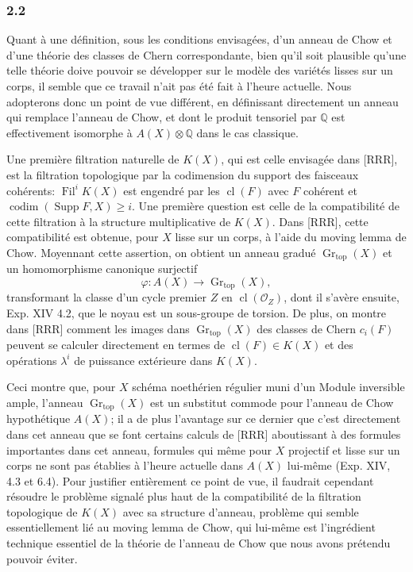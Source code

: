 \documentclass[11pt]{article}
\newcommand{\Gr}{\operatorname{Gr}}
\newcommand{\Fil}{\operatorname{Fil}}
\newcommand{\cl}{\operatorname{cl}}
\begin{document}
\subsubsection*{2.2}
Quant à une définition, sous les conditions envisagées, d'un anneau de Chow et d'une théorie des classes de Chern correspondante, bien qu'il soit plausible qu'une telle théorie doive pouvoir se développer sur le modèle des variétés lisses sur un corps, il semble que ce travail n'ait pas été fait à l'heure actuelle. Nous adopterons donc un point de vue différent, en définissant directement un anneau qui remplace l'anneau de Chow, et dont le produit tensoriel par $\mathbb Q$ est effectivement isomorphe à $A(X)\otimes\mathbb Q$ dans le cas classique.

Une première filtration naturelle de $K(X)$, qui est celle envisagée dans [RRR], est la filtration topologique par la codimension du support des faisceaux cohérents: $\Fil^iK(X)$ est engendré par les $\cl(F)$ avec $F$ cohérent et $\operatorname{codim}(\operatorname{Supp}F,X)\ge i$. Une première question est celle de la compatibilité de cette filtration à la structure multiplicative de $K(X)$. Dans [RRR], cette compatibilité est obtenue, pour $X$ lisse sur un corps, à l'aide du moving lemma de Chow. Moyennant cette assertion, on obtient un anneau gradué $\Gr_{\mathrm{top}}(X)$ et un homomorphisme canonique surjectif
\[
\varphi:A(X)\longrightarrow \Gr_{\mathrm{top}}(X),
\]
transformant la classe d'un cycle premier $Z$ en $\cl(\mathcal O_Z)$, dont il s'avère ensuite, Exp. XIV 4.2, que le noyau est un sous-groupe de torsion. De plus, on montre dans [RRR] comment les images dans $\Gr_{\mathrm{top}}(X)$ des classes de Chern $c_i(F)$ peuvent se calculer directement en termes de $\cl(F)\in K(X)$ et des opérations $\lambda^i$ de puissance extérieure dans $K(X)$.

Ceci montre que, pour $X$ schéma noethérien régulier muni d'un Module inversible ample, l'anneau $\Gr_{\mathrm{top}}(X)$ est un substitut commode pour l'anneau de Chow hypothétique $A(X)$; il a de plus l'avantage sur ce dernier que c'est directement dans cet anneau que se font certains calculs de [RRR] aboutissant à des formules importantes dans cet anneau, formules qui même pour $X$ projectif et lisse sur un corps ne sont pas établies à l'heure actuelle dans $A(X)$ lui-même (Exp. XIV, 4.3 et 6.4). Pour justifier entièrement ce point de vue, il faudrait cependant résoudre le problème signalé plus haut de la compatibilité de la filtration topologique de $K(X)$ avec sa structure d'anneau, problème qui semble essentiellement lié au moving lemma de Chow, qui lui-même est l'ingrédient technique essentiel de la théorie de l'anneau de Chow que nous avons prétendu pouvoir éviter.
\end{document}
